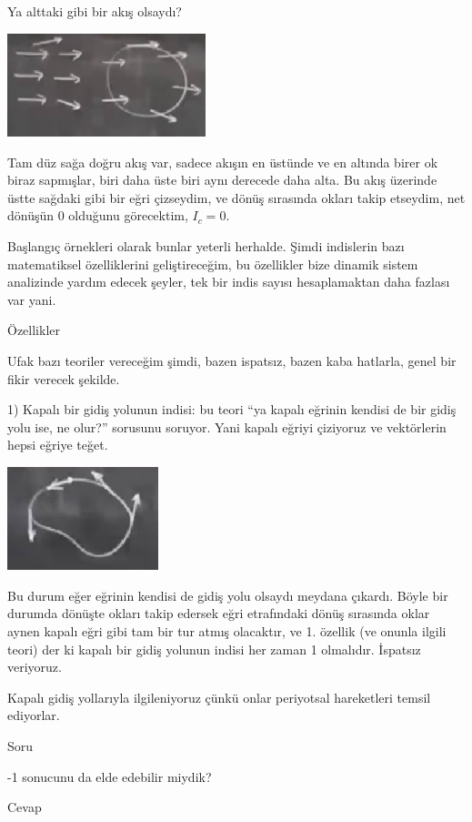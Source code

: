 \documentclass[12pt,fleqn]{article}\usepackage{../../common}
\begin{document}
Ya alttaki gibi bir akış olsaydı? 

\includegraphics[height=3cm]{08_24.png}

Tam düz sağa doğru akış var, sadece akışın en üstünde ve en altında birer ok
biraz sapmışlar, biri daha üste biri aynı derecede daha alta. Bu akış üzerinde
üstte sağdaki gibi bir eğri çizseydim, ve dönüş sırasında okları takip etseydim,
net dönüşün 0 olduğunu görecektim, $I_c = 0$. 

Başlangıç örnekleri olarak bunlar yeterli herhalde. Şimdi indislerin bazı
matematiksel özelliklerini geliştireceğim, bu özellikler bize dinamik sistem
analizinde yardım edecek şeyler, tek bir indis sayısı hesaplamaktan daha
fazlası var yani.

Özellikler

Ufak bazı teoriler vereceğim şimdi, bazen ispatsız, bazen kaba hatlarla, genel
bir fikir verecek şekilde.

1) Kapalı bir gidiş yolunun indisi: bu teori ``ya kapalı eğrinin kendisi de bir
gidiş yolu ise, ne olur?'' sorusunu soruyor. Yani kapalı eğriyi çiziyoruz ve
vektörlerin hepsi eğriye teğet. 

\includegraphics[height=3cm]{08_25.png}

Bu durum eğer eğrinin kendisi de gidiş yolu olsaydı meydana çıkardı. Böyle bir
durumda dönüşte okları takip edersek eğri etrafındaki dönüş sırasında oklar
aynen kapalı eğri gibi tam bir tur atmış olacaktır, ve 1. özellik (ve onunla
ilgili teori) der ki kapalı bir gidiş yolunun indisi her zaman 1
olmalıdır. İspatsız veriyoruz.

Kapalı gidiş yollarıyla ilgileniyoruz çünkü onlar periyotsal hareketleri temsil
ediyorlar.

Soru

-1 sonucunu da elde edebilir miydik?

Cevap
\end{document}
